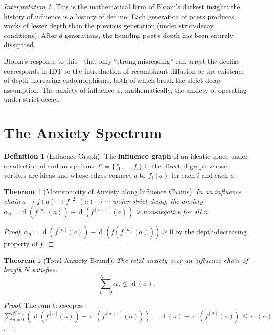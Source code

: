 \documentclass[11pt,openany]{book}
\theoremstyle{definition}
\newtheorem{definition}[axiom]{Definition}
\theoremstyle{plain}
\newtheorem{theorem}[axiom]{Theorem}
\theoremstyle{remark}
\newtheorem{interpretation}[axiom]{Interpretation}
\newcommand{\depth}{\operatorname{d}}       %
\begin{document}
\begin{interpretation}
This is the mathematical form of Bloom's darkest insight: the history of influence is a history of decline. Each generation of poets produces works of lesser depth than the previous generation (under strict-decay conditions). After $d$ generations, the founding poet's depth has been entirely dissipated.

Bloom's response to this---that only ``strong misreading'' can arrest the decline---corresponds in IDT to the introduction of recombinant diffusion or the existence of depth-increasing endomorphisms, both of which break the strict-decay assumption. The anxiety of influence is, mathematically, the anxiety of operating under strict decay.
\end{interpretation}

\section{The Anxiety Spectrum}

\begin{definition}[Influence Graph]
The \textbf{influence graph} of an ideatic space under a collection of endomorphisms $\mathcal{F} = \{f_1, \ldots, f_k\}$ is the directed graph whose vertices are ideas and whose edges connect $a$ to $f_i(a)$ for each $i$ and each $a$.
\end{definition}

\begin{theorem}[Monotonicity of Anxiety along Influence Chains]
In an influence chain $a \to f(a) \to f^{[2]}(a) \to \cdots$ under strict decay, the anxiety $\alpha_n = \depth(f^{[n]}(a)) - \depth(f^{[n+1]}(a))$ is non-negative for all $n$.
\end{theorem}

\begin{proof}
$\alpha_n = \depth(f^{[n]}(a)) - \depth(f(f^{[n]}(a))) \geq 0$ by the depth-decreasing property of $f$.
\end{proof}

\begin{theorem}[Total Anxiety Bound]
The total anxiety over an influence chain of length $N$ satisfies:
\[
\sum_{n=0}^{N-1} \alpha_n \leq \depth(a).
\]
\end{theorem}

\begin{proof}
The sum telescopes:
$\sum_{n=0}^{N-1} (\depth(f^{[n]}(a)) - \depth(f^{[n+1]}(a))) = \depth(a) - \depth(f^{[N]}(a)) \leq \depth(a)$.
\end{proof}
\end{document}
